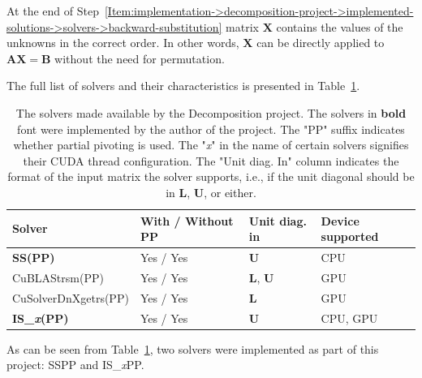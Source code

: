 At the end of Step~\ref{Item:implementation->decomposition-project->implemented-solutions->solvers->backward-substitution} matrix $\mathbf{X}$ contains the values of the unknowns in the correct order. In other words, $\mathbf{X}$ can be directly applied to $\mathbf{AX} = \mathbf{B}$ without the need for permutation.

The full list of solvers and their characteristics is presented in Table~\ref{Table:implementation->decomposition-project->implemented-solutions->solvers->solvers-in-the-project}.

\begin{table}[!ht]
	\centering
	\begin{tabular}{|l|l|l|l|}
		\hline
		\rowcolor[HTML]{C0C0C0}\textbf{Solver}              & \textbf{With / Without PP} & \textbf{Unit diag. in}     & \textbf{Device supported} \\ \hline
		\cellcolor[HTML]{EFEFEF}\textbf{SS(PP)}             & Yes / Yes                  & $\mathbf{U}$               & CPU                       \\
		\cellcolor[HTML]{EFEFEF}CuBLAStrsm(PP)              & Yes / Yes                  & $\mathbf{L}$, $\mathbf{U}$ & GPU                       \\
		\cellcolor[HTML]{EFEFEF}CuSolverDnXgetrs(PP)        & Yes / Yes                  & $\mathbf{L}$               & GPU                       \\
		\cellcolor[HTML]{EFEFEF}\textbf{IS\_\textit{x}(PP)} & Yes / Yes                  & $\mathbf{U}$               & CPU, GPU                  \\ \hline
	\end{tabular}
	\caption{The solvers made available by the Decomposition project. The solvers in \textbf{bold} font were implemented by the author of the project. The "PP" suffix indicates whether partial pivoting is used. The "\textit{x}" in the name of certain solvers signifies their CUDA thread configuration. The "Unit diag. In" column indicates the format of the input matrix the solver supports, i.e., if the unit diagonal should be in $\mathbf{L}$, $\mathbf{U}$, or either.}
	\label{Table:implementation->decomposition-project->implemented-solutions->solvers->solvers-in-the-project}
\end{table}

As can be seen from Table~\ref{Table:implementation->decomposition-project->implemented-solutions->solvers->solvers-in-the-project}, two solvers were implemented as part of this project: SSPP and IS\_\textit{x}PP.


